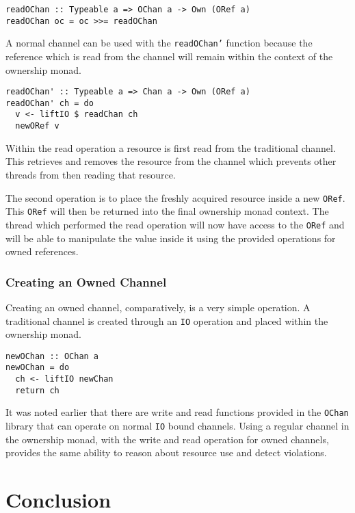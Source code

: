 \documentclass[onehalf,11pt]{beavtex}
\begin{document}
\begin{verbatim}
readOChan :: Typeable a => OChan a -> Own (ORef a)
readOChan oc = oc >>= readOChan
\end{verbatim}

A normal channel can be used with the \texttt{readOChan'} function because
the reference which is read from the channel will remain within the context
of the ownership monad. 

\begin{verbatim}
readOChan' :: Typeable a => Chan a -> Own (ORef a)
readOChan' ch = do
  v <- liftIO $ readChan ch
  newORef v
\end{verbatim}

Within the read operation a resource is first read from the traditional
channel.
This retrieves and removes the resource from the channel which prevents other
threads from then reading that resource.

The second operation is to place the freshly acquired resource inside a new
\texttt{ORef}.  This \texttt{ORef} will then be returned into the
final ownership monad context.
The thread which performed the read operation will now have access to the
\texttt{ORef} and will be able to manipulate the value inside it using the
provided operations for owned references.


\subsection{Creating an Owned Channel}

Creating an owned channel, comparatively, is a very simple operation.
A traditional channel is created through an \texttt{IO} operation and placed
within the ownership monad.

\begin{verbatim}
newOChan :: OChan a
newOChan = do
  ch <- liftIO newChan
  return ch
\end{verbatim}

It was noted earlier that there are write and read functions provided
in the \texttt{OChan} library that can operate on normal \texttt{IO} bound
channels.  Using a regular channel in the ownership monad,
with the write and read operation for owned channels,
provides the same ability to reason about resource use and detect violations.



\chapter{Conclusion}
\end{document}
